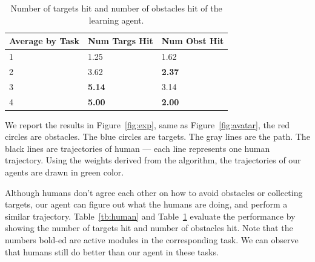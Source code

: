 \documentclass[11pt]{article} %
\begin{document}
\begin{table}[h!]
\centering
\begin{tabular}{| l| l| l |}
\hline
Average by Task & Num Targs Hit & Num Obst Hit\\
\hline
1 & 1.25 & 1.62\\
\hline
2 & 3.62 & \bf{2.37}\\
\hline
3 & \bf{5.14} & 3.14\\
\hline
4 & \bf{5.00} & \bf{2.00}\\
\hline
\end{tabular}
\caption{Number of targets hit and number of obstacles hit of the learning agent.}
\label{tb:agent}
\end{table}

We report the results in Figure~\ref{fig:exp}, same as Figure~\ref{fig:avatar},
the red circles are obstacles. The blue circles are targets. The gray lines are
the path. The black lines are trajectories of human --- each line represents one
human trajectory.
Using the weights derived from the algorithm, the trajectories of our agents are
drawn in green color.

Although humans don't agree each other on how to avoid obstacles or collecting
targets, our agent can figure out what the humans are doing, and perform a
similar trajectory. Table~\ref{tb:human} and Table~\ref{tb:agent} evaluate the
performance by showing the number of targets hit and number of obstacles hit.
Note that the numbers bold-ed are active modules in the corresponding task. We
can observe that humans still do better than our agent in these tasks.
\end{document}
